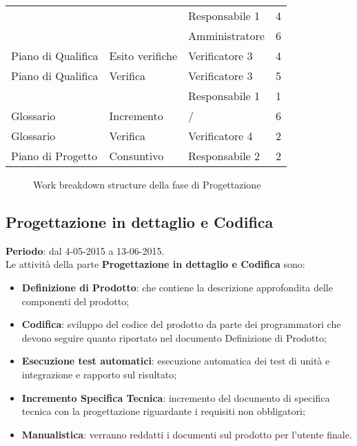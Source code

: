 {{\begin{longtable} [c]{| l | l | l | l |}
		&	&	Responsabile 1 & 4\\
		&	&	Amministratore & 6\\
		Piano di Qualifica & Esito verifiche & Verificatore 3 & 4 \\
		Piano di Qualifica & Verifica & Verificatore 3 & 5\\
		&	&	Responsabile 1 & 1\\
		Glossario & Incremento & / & 6 \\
		Glossario & Verifica & Verificatore 4 & 2 \\
		Piano di Progetto\ped{g} & Consuntivo & Responsabile 2 & 2\\
	\end{longtable}

	\begin{landscape}
		\thispagestyle{empty}
		\begin{figure}[H]
			\parbox[c][\textwidth][s]{\linewidth}{
			\centering
			\vspace*{\fill}
			\vspace*{\fill}
			\label{fig:wbsProgettazione}
			\caption{Work breakdown structure della fase di Progettazione}}
		\end{figure}
	\end{landscape}
}

\newpage
\subsection{Progettazione in dettaglio e Codifica}{
	\textbf{Periodo}: dal 4-05-2015 a 13-06-2015. \\
	 
	 Le attività della parte \textbf{Progettazione in dettaglio e Codifica} sono:
	 \begin{itemize}
		 \item \textbf{Definizione di Prodotto}: che contiene la descrizione approfondita delle componenti del prodotto;
		 \item \textbf{Codifica}: sviluppo del codice del prodotto da parte dei programmatori che devono seguire quanto riportato nel documento Definizione di Prodotto;
		 \item \textbf{Esecuzione test automatici}: esecuzione automatica dei test di unità e integrazione e rapporto sul risultato;
		 \item \textbf{Incremento Specifica Tecnica}: incremento del documento di specifica tecnica con la progettazione riguardante i requisiti non obbligatori;
		 \item \textbf{Manualistica}: verranno reddatti i documenti sul prodotto per l'utente finale.
	 \end{itemize}

}}
